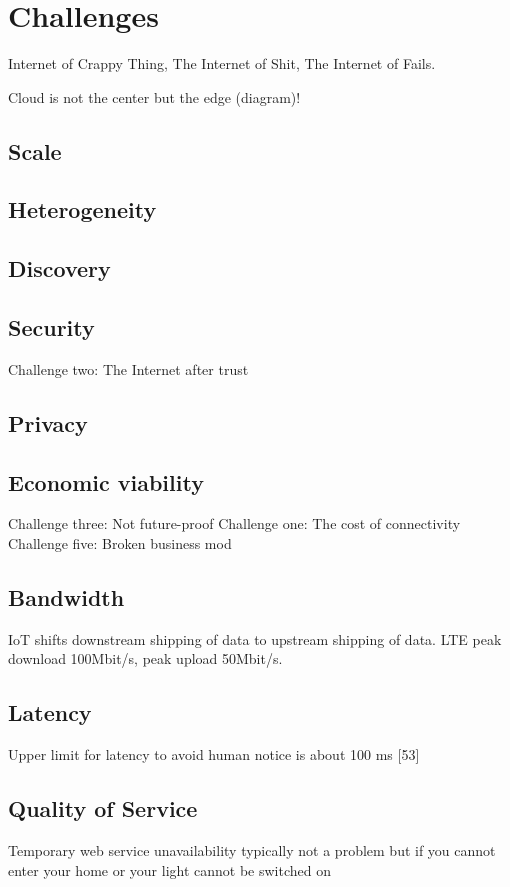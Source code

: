 \section{Challenges}

Internet of Crappy Thing, The Internet of Shit, The Internet of Fails.

Cloud is not the center but the edge (diagram)!

\subsection{Scale}
\subsection{Heterogeneity}
\subsection{Discovery}
\subsection{Security}
Challenge two: The Internet after trust
\subsection{Privacy}
\subsection{Economic viability}
Challenge three: Not future-proof
Challenge one: The cost of connectivity
Challenge five: Broken business mod
\subsection{Bandwidth}
IoT shifts downstream shipping of data to upstream shipping of data. LTE peak download 100Mbit/s, peak upload 50Mbit/s.

\subsection{Latency}
Upper limit for latency to avoid human notice is about 100 ms [53]

\subsection{Quality of Service}
Temporary web service unavailability typically not a problem but if you cannot enter your home or your light cannot be switched on 


